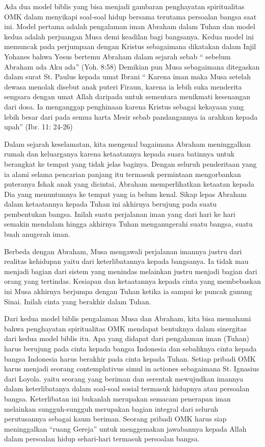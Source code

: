       Ada dua model biblis yang bisa menjadi gambaran penghayatan spiritualitas OMK dalam menyikapi soal-soal hidup bersama terutama persoalan bangsa saat ini. Model pertama adalah pengalaman iman Abraham dalam Tuhan dan model kedua adalah perjuangan Musa demi keadilan bagi bangsanya. Kedua model ini memuncak pada perjumpaan dengan Kristus sebagaimana dikatakan dalam Injil Yohanes bahwa Yesus bertemu Abraham dalam sejarah sebab “ sebelum Abraham ada Aku ada” (Yoh. 8:58) Demikian pun Musa sebagaimana ditegaskan dalam surat St. Paulus kepada umat Ibrani “ Karena iman maka Musa setelah dewasa menolak disebut anak puteri Firaun, karena ia lebih suka menderita sengsara dengan umat Allah daripada untuk sementara menikmati kesenangan dari dosa. Ia menganggap penghinaan karena Kristus sebagai kekayaan yang lebih besar dari pada semua harta Mesir sebab pandangannya ia arahkan kepada upah” (Ibr. 11: 24-26)
     
        Dalam sejarah keselamatan, kita mengenal bagaimana Abraham meninggalkan rumah dan keluarganya karena ketaatannya kepada suara batinnya untuk berangkat ke tempat yang tidak jelas baginya. Dengan seluruh penderitaan yang ia alami selama pencarian panjang itu termasuk permintaan mengorbankan puteranya Ishak anak yang dicintai, Abraham memperlihatkan  ketaatan kepada Dia yang menuntunnya ke tempat yang ia belum kenal. Sikap lepas Abraham dalam ketaatannya kepada Tuhan ini akhirnya berujung pada suatu pembentukan bangsa. Inilah suatu perjalanan iman yang dari hari ke hari semakin mendalam hingga akhirnya Tuhan menganugerahi suatu bangsa, suatu buah anugerah iman.
 
      Berbeda dengan Abraham, Musa mengawali perjalanan imannya justru dari realitas kehidupan yaitu dari keterlibatannya kepada bangsanya. Ia tidak mau menjadi bagian dari sistem yang menindas melainkan justru menjadi bagian dari orang yang tertindas. Kesiapan dan ketaatannya kepada cinta yang membebaskan ini Musa akhirnya berjumpa dengan Tuhan ketika ia sampai ke puncak gunung Sinai. Inilah cinta yang berakhir dalam Tuhan.
     
     Dari kedua model biblis pengalaman Musa dan Abraham, kita bisa memahami bahwa penghayatan spiritualitas OMK mendapat bentuknya dalam sinergitas dari kedua model biblis itu. Apa yang didapat dari pengalaman iman (Tuhan) harus berujung pada cinta kepada bangsa Indonesia dan sebaliknya cinta kepada bangsa Indonesia harus berakhir pada cinta kepada Tuhan.   Setiap pribadi OMK  harus menjadi seorang contemplativus simul in actiones sebagaimana St. Ignasius dari Loyola. yaitu seorang yang beriman dan serentak mewujudkan imannya dalam keterlibatanya dalam soal-soal sosial termasuk hidupnya atau persoalan bangsa. Keterlibatan ini bukanlah merupakan semacam penerapan iman melainkan sungguh-sungguh merupakan bagian integral dari seluruh perutusannya sebagai kaum beriman. Seorang pribadi OMK harus siap meninggalkan “ruang Gereja” untuk menggemakan jawabannya kepada Allah dalam persoalan hidup sehari-hari termasuk persoalan bangsa.
 
